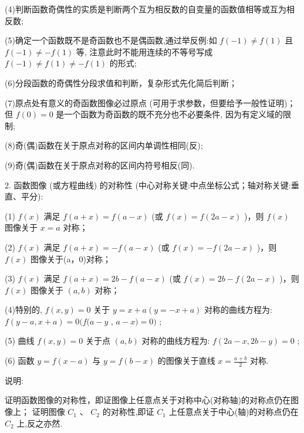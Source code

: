 (4)判断函数奇偶性的实质是判断两个互为相反数的自变量的函数值相等或互为相反数;

(5)确定一个函数既不是奇函数也不是偶函数,通过举反例:如 $f\left( {-1}\right)  \neq  f\left( 1\right)$ 且 $f\left( {-1}\right)  \neq   - f\left( 1\right)$ 等, 注意此时不能用连续的不等号写成 $f\left( {-1}\right)  \neq  f\left( 1\right)  \neq   - f\left( 1\right)$ 的形式;

(6)分段函数的奇偶性分段求值和判断，复杂形式先化简后判断；

(7)原点处有意义的奇函数图像必过原点 (可用于求参数，但要给予一般性证明)；但 $f\left( 0\right)  = 0$ 是一个函数为奇函数的既不充分也不必要条件, 因为有定义域的限制;

(8)奇(偶)函数在关于原点对称的区间内单调性相同(反);

(9)奇(偶)函数在关于原点对称的区间内符号相反(同).

2. 函数图像 (或方程曲线) 的对称性 (中心对称关键:中点坐标公式；轴对称关键:垂直、平分):

(1) $f\left( x\right)$ 满足 $f\left( {a + x}\right)  = f\left( {a - x}\right)$ (或 $f\left( x\right)  = f\left( {{2a} - x}\right)$ )，则 $f\left( x\right)$ 图像关于 $x = a$ 对称；

(2) $f\left( x\right)$ 满足 $f\left( {a + x}\right)  =  - f\left( {a - x}\right)$ (或 $f\left( x\right)  =  - f\left( {{2a} - x}\right)$ )，则 $f\left( x\right)$ 图像关于(a，0)对称；

(3) $f\left( x\right)$ 满足 $f\left( {a + x}\right)  = {2b} - f\left( {a - x}\right)$ (或 $f\left( x\right)  = {2b} - f\left( {{2a} - x}\right)$ )，则 $f\left( x\right)$ 图像关于 $\left( {a,b}\right)$ 对称；

(4)特别的, $f\left( {x,y}\right)  = 0$ 关于 $y = x + a\left( {y =  - x + a}\right)$ 对称的曲线方程为: $f\left( {y - a,x + a}\right)  = 0(f(a - y$ , $a - x) = 0)$ ;

(5) 曲线 $f\left( {x,y}\right)  = 0$ 关于点 $\left( {a,b}\right)$ 对称的曲线方程为: $f\left( {{2a} - x,{2b} - y}\right)  = 0$ ;

(6) 函数 $y = f\left( {x - a}\right)$ 与 $y = f\left( {b - x}\right)$ 的图像关于直线 $x = \frac{a + b}{2}$ 对称.

说明:

  证明函数图像的对称性，即证图像上任意点关于对称中心(对称轴)的对称点仍在图像上；  证明图像 ${C}_{1}\text{ 、 }{C}_{2}$ 的对称性,即证 ${C}_{1}$ 上任意点关于中心(轴)的对称点仍在 ${C}_{2}$ 上,反之亦然.

\HRule

